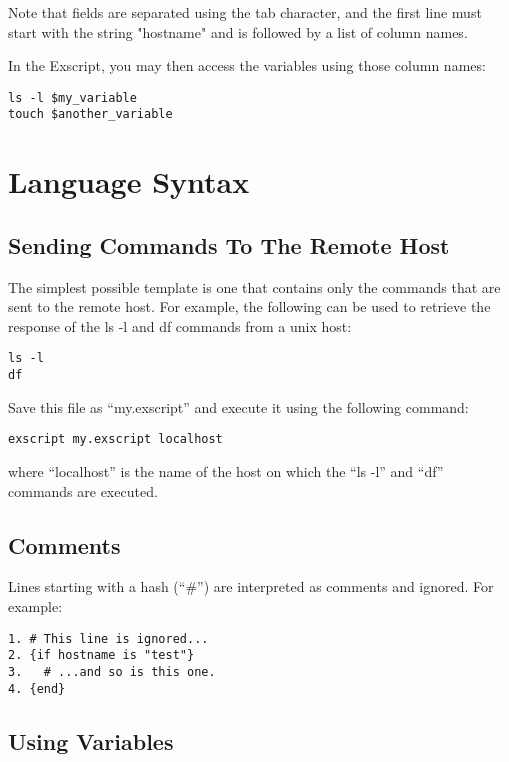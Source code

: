 Note that fields are separated using the tab character, and the first 
line must start with the string "hostname" and is followed by a list of 
column names.

In the Exscript, you may then access the variables using those column names: 

\begin{lstlisting}
ls -l $my_variable
touch $another_variable
\end{lstlisting}


\section{Language Syntax}
\subsection{Sending Commands To The Remote Host}

The simplest possible template is one that contains only the commands 
that are sent to the remote host. For example, the following \product 
can be used to retrieve the response of the ls -l and df commands from 
a unix host: 

\begin{lstlisting}
ls -l
df
\end{lstlisting}

Save this file as ``my.exscript'' and execute it using the following 
command: 

\begin{lstlisting}
exscript my.exscript localhost 
\end{lstlisting}

where ``localhost'' is the name of the host on which the ``ls -l'' 
and ``df'' commands are executed. 


\subsection{Comments}

Lines starting with a hash (``\#'') are interpreted as comments and ignored. 
For example: 

\begin{lstlisting}
1. # This line is ignored...
2. {if hostname is "test"}
3.   # ...and so is this one.
4. {end}
\end{lstlisting}


\subsection{Using Variables}

